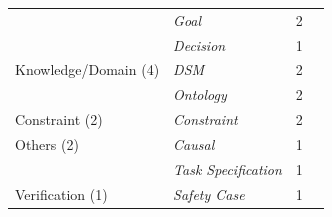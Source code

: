 \begin{tabular} {p{}  p{} p{} p{}}
 & \emph{Goal} & 2 & \cite{ \paperonehundredfiftysecond,\paperonehundredeightyfirst }\\ 
 & \emph{Decision} & 1 & \cite{ \paperninetyeighth }\\ 
\midrule  
Knowledge/Domain (4) & \emph{DSM} & 2 & \cite{ \papertwohundredthirteenth,\papertwohundredfortythird }\\ 
 & \emph{Ontology} & 2 & \cite{ \paperonehundredeightyfifth,\papertwohundredfiftythird }\\ 
\midrule  
Constraint (2) & \emph{Constraint} & 2 & \cite{ \paperonehundredfourteenth,\paperonehundredsixteenth }\\ 
\midrule  
Others (2) & \emph{Causal} & 1 & \cite{ \paperonehundredfortyeighth }\\ 
 & \emph{Task Specification} & 1 & \cite{ \papertwohundredeleventh }\\ 
\midrule  
Verification (1) & \emph{Safety Case} & 1 & \cite{ \paperonehundredseventyseventh }\\ 
\bottomrule 
\end{tabular} 

